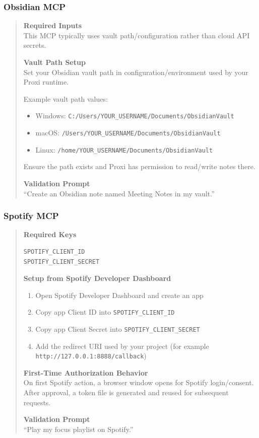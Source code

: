 \documentclass{article}
\begin{document}
\subsubsection{Obsidian MCP}
\begin{quote}
\noindent\textbf{Required Inputs}\\
This MCP typically uses vault path/configuration rather than cloud API secrets.

\noindent\textbf{Vault Path Setup}\\
Set your Obsidian vault path in configuration/environment used by your Proxi runtime.

Example vault path values:
\begin{itemize}
	\item Windows: \texttt{C:/Users/YOUR\_USERNAME/Documents/ObsidianVault}
	\item macOS: \texttt{/Users/YOUR\_USERNAME/Documents/ObsidianVault}
	\item Linux: \texttt{/home/YOUR\_USERNAME/Documents/ObsidianVault}
\end{itemize}

Ensure the path exists and Proxi has permission to read/write notes there.

\medskip
\noindent\textbf{Validation Prompt}\\
``Create an Obsidian note named Meeting Notes in my vault.''
\end{quote}

\subsubsection{Spotify MCP}
\begin{quote}
\noindent\textbf{Required Keys}
\begin{verbatim}
SPOTIFY_CLIENT_ID
SPOTIFY_CLIENT_SECRET
\end{verbatim}

\noindent\textbf{Setup from Spotify Developer Dashboard}
\begin{enumerate}
	\item Open Spotify Developer Dashboard and create an app
	\item Copy app Client ID into \texttt{SPOTIFY\_CLIENT\_ID}
	\item Copy app Client Secret into \texttt{SPOTIFY\_CLIENT\_SECRET}
	\item Add the redirect URI used by your project (for example \texttt{http://127.0.0.1:8888/callback})
\end{enumerate}

\medskip
\noindent\textbf{First-Time Authorization Behavior}\\
On first Spotify action, a browser window opens for Spotify login/consent. After approval, a token file is generated and reused for subsequent requests.

\medskip
\noindent\textbf{Validation Prompt}\\
``Play my focus playlist on Spotify.''
\end{quote}
\end{document}
